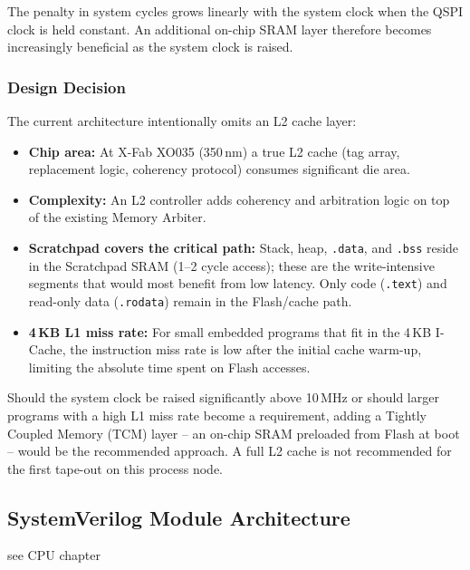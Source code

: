 The penalty in system cycles grows linearly with the system clock when
the QSPI clock is held constant.
An additional on-chip SRAM layer therefore becomes increasingly
beneficial as the system clock is raised.

\subsubsection{Design Decision}
\label{subsubsec:l2Decision}

The current architecture intentionally omits an L2 cache layer:

\begin{itemize}
  \item \textbf{Chip area:} At X-Fab XO035 (350\,nm) a true L2 cache
    (tag array, replacement logic, coherency protocol) consumes
    significant die area.
  \item \textbf{Complexity:} An L2 controller adds coherency and
    arbitration logic on top of the existing Memory Arbiter.
  \item \textbf{Scratchpad covers the critical path:}
    Stack, heap, \texttt{.data}, and \texttt{.bss} reside in the
    Scratchpad SRAM (1--2 cycle access); these are the write-intensive
    segments that would most benefit from low latency.
    Only code (\texttt{.text}) and read-only data (\texttt{.rodata})
    remain in the Flash/cache path.
  \item \textbf{4\,KB L1 miss rate:} For small embedded programs that
    fit in the 4\,KB I-Cache, the instruction miss rate is low after
    the initial cache warm-up, limiting the absolute time spent on
    Flash accesses.
\end{itemize}

Should the system clock be raised significantly above 10\,MHz or should
larger programs with a high L1 miss rate become a requirement, adding a
Tightly Coupled Memory (TCM) layer -- an on-chip SRAM preloaded from
Flash at boot -- would be the recommended approach.
A full L2 cache is not recommended for the first tape-out on this
process node.

\subsection{SystemVerilog Module Architecture}
\label{subsec:svModules}
see CPU chapter


